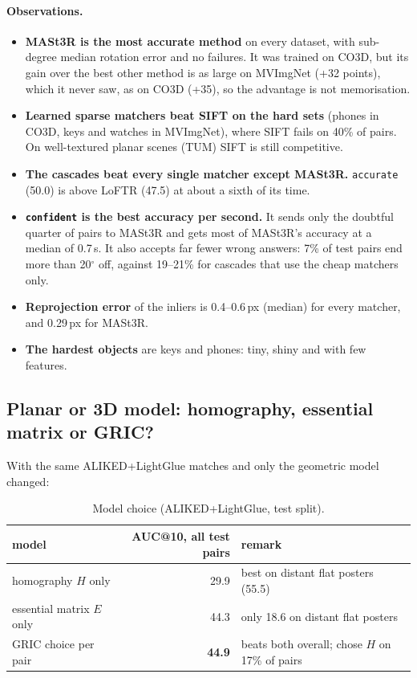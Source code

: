 \documentclass[11pt,a4paper]{article}
\newcommand{\best}[1]{\textbf{#1}}
\begin{document}
\paragraph{Observations.}
\begin{itemize}
  \item \textbf{MASt3R is the most accurate method} on every dataset, with sub-degree median
        rotation error and no failures. It was trained on CO3D, but its gain over the best
        other method is as large on MVImgNet (+32 points), which it never saw, as on CO3D (+35), so the
        advantage is not memorisation.
  \item \textbf{Learned sparse matchers beat SIFT on the hard sets} (phones in CO3D, keys and
        watches in MVImgNet), where SIFT fails on 40\% of pairs. On well-textured planar scenes
        (TUM) SIFT is still competitive.
  \item \textbf{The cascades beat every single matcher except MASt3R.} \texttt{accurate} (50.0) is
        above LoFTR (47.5) at about a sixth of its time.
  \item \textbf{\texttt{confident} is the best accuracy per second.} It sends only the doubtful
        quarter of pairs to MASt3R and gets most of MASt3R's accuracy at a median of 0.7\,s. It also
        accepts far fewer wrong answers: 7\% of test pairs end more than 20$^\circ$ off, against 19--21\%
        for cascades that use the cheap matchers only.
  \item \textbf{Reprojection error} of the inliers is 0.4--0.6\,px (median) for every matcher, and
        0.29\,px for MASt3R.
  \item \textbf{The hardest objects} are keys and phones: tiny, shiny and with few features.
\end{itemize}

\subsection{Planar or 3D model: homography, essential matrix or GRIC?}
With the same ALIKED+LightGlue matches and only the geometric model changed:

\begin{table}[H]
\centering
\small
\begin{tabular}{l r l}
\toprule
model & AUC@10, all test pairs & remark \\
\midrule
homography $H$ only & 29.9 & best on distant flat posters (55.5) \\
essential matrix $E$ only & 44.3 & only 18.6 on distant flat posters \\
GRIC choice per pair & \best{44.9} & beats both overall; chose $H$ on 17\% of pairs \\
\bottomrule
\end{tabular}
\caption{Model choice (ALIKED+LightGlue, test split).}
\end{table}
\end{document}
